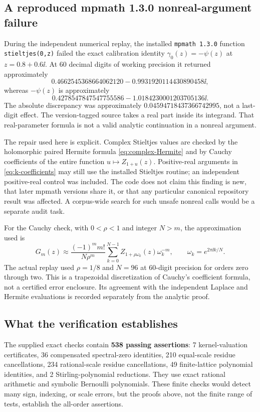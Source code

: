 \subsection{A reproduced mpmath 1.3.0 nonreal-argument failure}
\label{sec:software-audit}
During the independent numerical replay, the installed
\texttt{mpmath 1.3.0} function \texttt{stieltjes(0,z)} failed the exact
calibration identity $\gamma_0(z)=-\psi(z)$ at $z=0.8+0.6\ii$.
At 60 decimal digits of working precision it returned approximately
\[
 0.4662545368664062120-0.9931920114430890458\ii,
\]
whereas $-\psi(z)$ is approximately
\[
 0.4278547847547755586-1.0184230001203705136\ii.
\]
The absolute discrepancy was approximately
$0.04594718437366742995$, not a last-digit effect.
The version-tagged source \cite{mpmath13} takes a real part inside its
integrand. That real-parameter formula is not a valid analytic continuation
in a nonreal argument.

The repair used here is explicit. Complex Stieltjes values are checked by
the holomorphic paired Hermite formula \eqref{eq:complex-Hermite} and by
Cauchy coefficients of the entire function $u\mapsto Z_{1+u}(z)$.
Positive-real arguments in \eqref{eq:k-coefficients} may still use the
installed Stieltjes routine; an independent positive-real control was
included. The code does not claim this finding is new, that later mpmath
versions share it, or that any particular canonical repository result
was affected. A corpus-wide search for such unsafe nonreal calls would
be a separate audit task.

For the Cauchy check, with $0<\rho<1$ and integer $N>m$, the approximation
used is
\begin{equation}\label{eq:Cauchy-diagnostic}
 G_m(z)\approx\frac{(-1)^m m!}{N\rho^m}
   \sum_{k=0}^{N-1}Z_{1+\rho\omega_k}(z)\omega_k^{-m},
 \qquad \omega_k=e^{2\pi\ii k/N}.
\end{equation}
The actual replay used $\rho=1/8$ and $N=96$ at 60-digit precision for
orders zero through two. This is a trapezoidal discretization of Cauchy's
coefficient formula, not a certified error enclosure. Its agreement with
the independent Laplace and Hermite evaluations is recorded separately
from the analytic proof.

\subsection{What the verification establishes}
The supplied exact checks contain \textbf{538 passing assertions}:
7 kernel-valuation certificates, 36 compensated spectral-zero identities,
210 equal-scale residue cancellations, 234 rational-scale residue
cancellations, 49 finite-lattice polynomial identities, and 2
Stirling-polynomial reductions. They use exact rational arithmetic and
symbolic Bernoulli polynomials. These finite checks would detect many
sign, indexing, or scale errors, but the proofs above, not the finite
range of tests, establish the all-order assertions.

